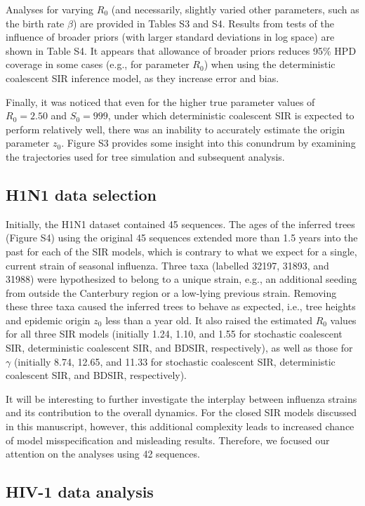 \documentclass[10pt]{article}
\newcommand{\stochCoalSIR}{stochastic coalescent SIR}
\newcommand{\deterCoalSIR}{deterministic coalescent SIR}
\newcommand{\BDSIR}{BDSIR}
\begin{document}
Analyses for varying $R_0$ (and necessarily, slightly varied other parameters, such as the birth rate $\beta$) are provided 
in Tables S3 and S4.  Results from tests of the influence of broader priors (with larger standard deviations in log space) are shown in Table S4.  
It appears that allowance of broader priors reduces 95\% HPD coverage in some cases (e.g., for parameter $R_0$) when using the \deterCoalSIR{} inference model, as they increase error and bias.

Finally, it was noticed that even for the higher true parameter values of $R_{0}=2.50$ and $S_{0}=999$, under which \deterCoalSIR{} is expected to 
perform relatively well, there was an inability to accurately estimate the origin parameter $z_0$.  Figure S3 provides some insight into 
this conundrum by examining the trajectories used for tree simulation and subsequent analysis. 

\subsection{H1N1 data selection}

Initially, the H1N1 dataset contained 45 sequences.  The ages of the inferred trees (Figure S4) using the original 45 sequences 
extended more than 1.5 years into the past for each of the SIR models, which is contrary to what we expect for a single, current strain of seasonal influenza.  
Three taxa (labelled 32197, 31893, and 31988) were hypothesized to belong to a unique strain, e.g., an additional seeding from outside the 
Canterbury region or a low-lying previous strain.  Removing these three taxa caused the inferred trees to behave as expected, i.e., tree heights and 
epidemic origin $z_0$ less than a year old.  It also raised the estimated $R_0$ values for all three SIR models (initially 1.24, 1.10, and 1.55 for \stochCoalSIR{}, 
\deterCoalSIR{}, and \BDSIR{}, respectively), as well as those for $\gamma$ (initially 8.74, 12.65, and 11.33 for \stochCoalSIR{}, 
\deterCoalSIR{}, and \BDSIR{}, respectively).  

It will be interesting to further investigate the interplay between influenza strains and its contribution to the overall dynamics.  
For the closed SIR models discussed in this manuscript, however, this additional complexity leads to increased chance of model misspecification and misleading results.  
Therefore, we focused our attention on the analyses using 42 sequences.


\subsection{HIV-1 data analysis}
\end{document}
